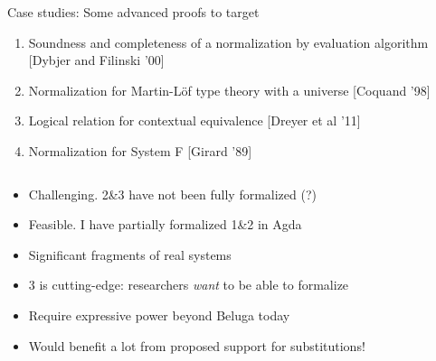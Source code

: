 \documentclass[usenames,dvipsnames]{beamer}
\begin{document}
\begin{frame}{Case studies: Some advanced proofs to target}
\begin{enumerate}
\item Soundness and completeness of a normalization by evaluation algorithm [Dybjer and Filinski '00]
\item Normalization for Martin-L\"of type theory with a universe [Coquand '98]
\item Logical relation for contextual equivalence [Dreyer et al '11]
\item Normalization for System F [Girard '89]
\end{enumerate}

$\,$

\begin{itemize}
\item Challenging. 2\&{}3 have not been fully formalized (?)
\item Feasible. I have partially formalized 1\&{}2 in Agda
\item Significant fragments of real systems
\item 3 is cutting-edge: researchers \emph{want} to be able to formalize
\item Require expressive power beyond Beluga today
\item Would benefit a lot from proposed support for substitutions!
\end{itemize}
\end{frame}

\end{document}
